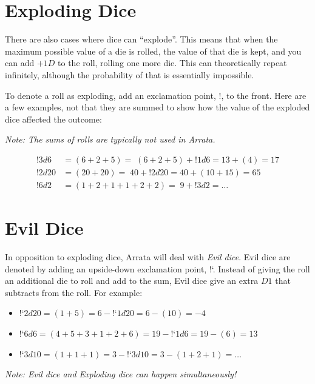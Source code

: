 \documentclass[../main.tex]{subfiles}
\begin{document}
    \section{Exploding Dice}

    There are also cases where dice can ``explode''. This means that when the maximum possible value of a die is rolled, the value of that die is kept, and you can add $+1D$ to the roll, rolling one more die. This can theoretically repeat infinitely, although the probability of that is essentially impossible.

    To denote a roll as exploding, add an exclamation point, $!$, to the front. Here are a few examples, not that they are summed to show how the value of the exploded dice affected the outcome:
    
    \emph{Note: The sums of rolls are typically not used in Arrata.}
    \begin{mdframed}[style=Arrata]
        \begin{align*}
            !3d6    & = (6 + 2 + 5) =\; (6 + 2 + 5) + !1d6 = 13 + (4) = 17  \\
            !2d20   & = (20 + 20) =\; 40 + !2d20 = 40 + (10 + 15) = 65      \\
            !6d2    & = (1 + 2 + 1 + 1 + 2 + 2) =\; 9 + !3d2  = \dots    
        \end{align*}
    \end{mdframed}

    \section{Evil Dice}

    In opposition to exploding dice, Arrata will deal with {\em Evil dice}. Evil dice are denoted by adding an upside-down exclamation point, !`. Instead of giving the roll an additional die to roll and add to the sum, Evil dice give an extra $D1$ that subtracts from the roll. For example:

    \begin{itemize}
        \item!`$2d20 = (1 + 5) = 6 - $!`$1d20 = 6 - (10) = -4$
        \item!`$6d6 = (4 + 5 + 3 + 1 + 2 + 6) = 19 - $!`$1d6 = 19 - (6) = 13$
        \item!`$3d10 = (1 + 1 + 1) = 3 - $!`$3d10 = 3 - (1 + 2 + 1) = \dots$
    \end{itemize}

    {\em Note: Evil dice and Exploding dice can happen simultaneously!}
\end{document}
